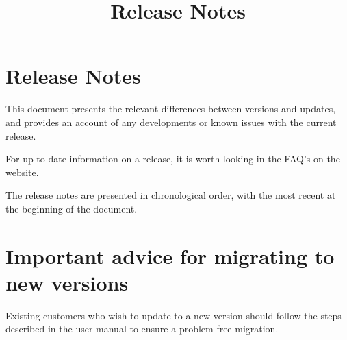 
\title{Release Notes}
\maketitle

\setcounter{secnumdepth}{0}

\clearpage
\section{Release Notes}
This document presents the relevant differences between versions and updates, and provides an account of any developments or known issues with the current release. 

For up-to-date information on a release, it is worth looking in the FAQ's on the website. 

The release notes are presented in chronological order, with the most recent at the beginning of the document.  

\section{Important advice for migrating to new  versions}
Existing customers who wish to update to a new version should follow the steps described in the user manual to ensure a problem-free migration.






